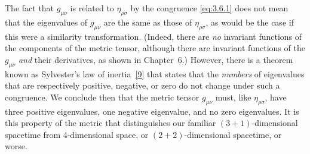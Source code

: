 The fact that $g_{\mu\nu}$ is related to $\eta_{\rho\sigma}$ by the
congruence \eqref{eq:3.6.1} does not mean that the eigenvalues of
$g_{\mu\nu}$ are the same as those of $\eta_{\rho\sigma}$, as would be the
case if this were a similarity transformation. (Indeed, there are
\emph{no} invariant functions of the components of the metric tensor,
although there are invariant functions of the $g_{\mu\nu}$ \emph{and} their
derivatives, as shown in Chapter~6.) However, there is a theorem known as
Sylvester's law of inertia~\hyperref[ch3-ref-9]{[9]} that states that the
\emph{numbers} of eigenvalues that are respectively positive, negative, or
zero do not change under such a congruence. We conclude then that the metric
tensor $g_{\mu\nu}$ must, like $\eta_{\rho\sigma}$, have three positive
eigenvalues, one negative eigenvalue, and no zero eigenvalues. It is this
property of the metric that distinguishes our familiar $(3+1)$-dimensional
spacetime from 4-dimensional space, or $(2+2)$-dimensional spacetime, or
worse.
